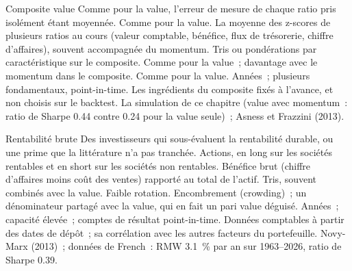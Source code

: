 \begin{strategyfile}{Composite value}\label{strat:s1:value-quality-and-low-risk:composite}
 Comme pour la value, l'erreur de mesure de chaque ratio pris isolément étant moyennée.
 Comme pour la value.
 La moyenne des z-scores de plusieurs ratios au cours (valeur comptable, bénéfice, flux de trésorerie, chiffre d'affaires), souvent accompagnée du momentum.
 Tris ou pondérations par caractéristique sur le composite.
 Comme pour la value~; davantage avec le momentum dans le composite.
 Comme pour la value.
 Années~; plusieurs fondamentaux, point-in-time.
 Les ingrédients du composite fixés à l'avance, et non choisis sur le backtest.
 La simulation de ce chapitre (value avec momentum~: ratio de Sharpe 0.44 contre 0.24 pour la value seule)~; Asness et Frazzini (2013).
\end{strategyfile}

\begin{strategyfile}{Rentabilité brute}\label{strat:s1:value-quality-and-low-risk:profitability}
 Des investisseurs qui sous-évaluent la rentabilité durable, ou une prime que la littérature n'a pas tranchée.
 Actions, en long sur les sociétés rentables et en short sur les sociétés non rentables.
 Bénéfice brut (chiffre d'affaires moins coût des ventes) rapporté au total de l'actif.
 Tris, souvent combinés avec la value.
 Faible rotation.
 Encombrement (crowding)~; un dénominateur partagé avec la value, qui en fait un pari value déguisé.
 Années~; capacité élevée~; comptes de résultat point-in-time.
 Données comptables à partir des dates de dépôt~; sa corrélation avec les autres facteurs du portefeuille.
 Novy-Marx (2013)~; données de French~: RMW 3.1~\% par an sur 1963--2026, ratio de Sharpe 0.39.
\end{strategyfile}

